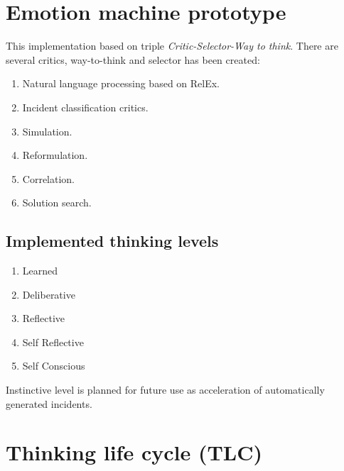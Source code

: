 \documentclass[runningheads,a4paper]{llncs}
\begin{document}
\section{Emotion machine prototype}
This implementation based on triple \emph{Critic-Selector-Way to think}. There are several critics, way-to-think and selector has been created:

\begin{enumerate}
 \item Natural language processing based on RelEx.
 \item Incident classification critics.
 \item Simulation.
 \item Reformulation.
 \item Correlation.
 \item Solution search.
\end{enumerate}

\subsection{Implemented thinking levels}

\begin{enumerate}
 \item Learned
 \item Deliberative
 \item Reflective
 \item Self Reflective
 \item Self Conscious
\end{enumerate}

Instinctive level is planned for future use as acceleration of automatically generated incidents.

\section{Thinking life cycle (TLC)}
\end{document}
